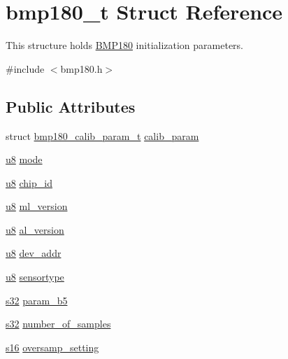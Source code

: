 \hypertarget{structbmp180__t}{}\section{bmp180\+\_\+t Struct Reference}
\label{structbmp180__t}


This structure holds \hyperlink{classBMP180}{B\+M\+P180} initialization parameters.  




{\ttfamily \#include $<$bmp180.\+h$>$}

\subsection*{Public Attributes}
\begin{DoxyCompactItemize}
\item 
struct \hyperlink{structbmp180__calib__param__t}{bmp180\+\_\+calib\+\_\+param\+\_\+t} \hyperlink{structbmp180__t_af9052e0c95ba7c63157703465ff14ef1}{calib\+\_\+param}
\item 
\hyperlink{bmp180_8h_aed742c436da53c1080638ce6ef7d13de}{u8} \hyperlink{structbmp180__t_ac5514a7ce3e3d23f7a6722711039edba}{mode}
\item 
\hyperlink{bmp180_8h_aed742c436da53c1080638ce6ef7d13de}{u8} \hyperlink{structbmp180__t_af41f334824c5e9e6d0bb72507a734dec}{chip\+\_\+id}
\item 
\hyperlink{bmp180_8h_aed742c436da53c1080638ce6ef7d13de}{u8} \hyperlink{structbmp180__t_a369cb61fc9c7de06061f13eb8be5aa34}{ml\+\_\+version}
\item 
\hyperlink{bmp180_8h_aed742c436da53c1080638ce6ef7d13de}{u8} \hyperlink{structbmp180__t_aef41548b2ff2ff3cc7db7984cace6918}{al\+\_\+version}
\item 
\hyperlink{bmp180_8h_aed742c436da53c1080638ce6ef7d13de}{u8} \hyperlink{structbmp180__t_a1fac092bc595a86dc1dae9604f557d5e}{dev\+\_\+addr}
\item 
\hyperlink{bmp180_8h_aed742c436da53c1080638ce6ef7d13de}{u8} \hyperlink{structbmp180__t_a9b9ced8e0fdb8fb0ab04a875e4d46f38}{sensortype}
\item 
\hyperlink{bmp180_8h_a0ce6887c26c1c49ad3be5710dd42bfd6}{s32} \hyperlink{structbmp180__t_ae753cf9c8d8f28a1b3395c472acb61fb}{param\+\_\+b5}
\item 
\hyperlink{bmp180_8h_a0ce6887c26c1c49ad3be5710dd42bfd6}{s32} \hyperlink{structbmp180__t_a919c92f3b67c115eb7546855d3322f8f}{number\+\_\+of\+\_\+samples}
\item 
\hyperlink{bmp180_8h_a4cb19f4a3324cfe0938ddfbfabaa825b}{s16} \hyperlink{structbmp180__t_a6ade944cf9275b333add5785f33701bd}{oversamp\+\_\+setting}

\end{DoxyCompactItemize}
